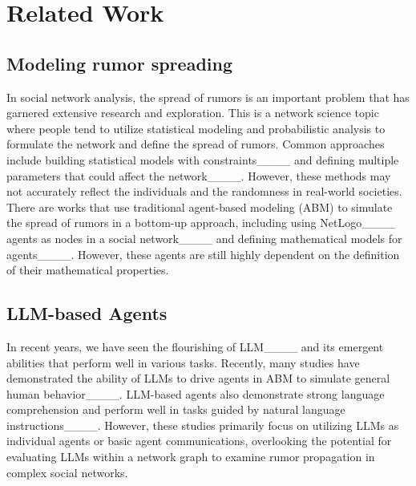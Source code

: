 \section{Related Work}
\label{sec:related_work}

\subsection{Modeling rumor spreading} 
In social network analysis, the spread of rumors is an important problem that has garnered extensive research and exploration. 
This is a network science topic where people tend to utilize statistical modeling and probabilistic analysis to formulate the network and define the spread of rumors. 
Common approaches include building statistical models with constraints____ and defining multiple parameters that could affect the network____. 
However, these methods may not accurately reflect the individuals and the randomness in real-world societies.
There are works that use traditional agent-based modeling (ABM) to simulate the spread of rumors in a bottom-up approach, including using NetLogo____ agents as nodes in a social network____ and defining mathematical models for agents____. 
However, these agents are still highly dependent on the definition of their mathematical properties.

\subsection{LLM-based Agents} 
In recent years, we have seen the flourishing of LLM____ and its emergent abilities that perform well in various tasks. 
Recently, many studies have demonstrated the ability of LLMs to drive agents in ABM to simulate general human behavior____.
LLM-based agents also demonstrate strong language comprehension and perform well in tasks guided by natural language instructions____.
However, these studies primarily focus on utilizing LLMs as individual agents or basic agent communications, overlooking the potential for evaluating LLMs within a network graph to examine rumor propagation in complex social networks.


